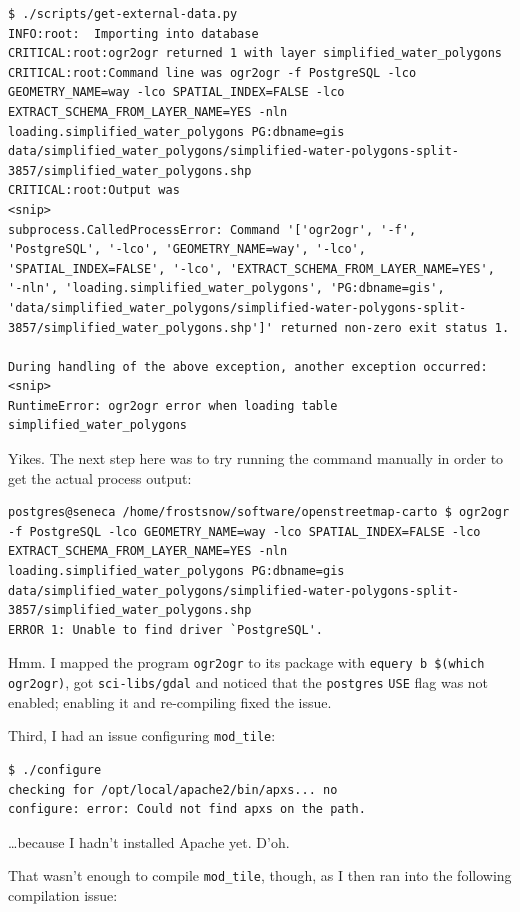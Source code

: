 \documentclass{article}
\begin{document}
\begin{verbatim}
$ ./scripts/get-external-data.py
INFO:root:  Importing into database
CRITICAL:root:ogr2ogr returned 1 with layer simplified_water_polygons
CRITICAL:root:Command line was ogr2ogr -f PostgreSQL -lco GEOMETRY_NAME=way -lco SPATIAL_INDEX=FALSE -lco EXTRACT_SCHEMA_FROM_LAYER_NAME=YES -nln loading.simplified_water_polygons PG:dbname=gis data/simplified_water_polygons/simplified-water-polygons-split-3857/simplified_water_polygons.shp
CRITICAL:root:Output was
<snip>
subprocess.CalledProcessError: Command '['ogr2ogr', '-f', 'PostgreSQL', '-lco', 'GEOMETRY_NAME=way', '-lco', 'SPATIAL_INDEX=FALSE', '-lco', 'EXTRACT_SCHEMA_FROM_LAYER_NAME=YES', '-nln', 'loading.simplified_water_polygons', 'PG:dbname=gis', 'data/simplified_water_polygons/simplified-water-polygons-split-3857/simplified_water_polygons.shp']' returned non-zero exit status 1.

During handling of the above exception, another exception occurred:
<snip>
RuntimeError: ogr2ogr error when loading table simplified_water_polygons
\end{verbatim}

Yikes.  The next step here was to try running the command manually in order to get the actual process output:

\begin{verbatim}
postgres@seneca /home/frostsnow/software/openstreetmap-carto $ ogr2ogr -f PostgreSQL -lco GEOMETRY_NAME=way -lco SPATIAL_INDEX=FALSE -lco EXTRACT_SCHEMA_FROM_LAYER_NAME=YES -nln loading.simplified_water_polygons PG:dbname=gis data/simplified_water_polygons/simplified-water-polygons-split-3857/simplified_water_polygons.shp
ERROR 1: Unable to find driver `PostgreSQL'.
\end{verbatim}

Hmm.  I mapped the program \texttt{ogr2ogr} to its package with \texttt{equery b \$(which ogr2ogr)}, got \texttt{sci-libs/gdal} and noticed that the \texttt{postgres} \texttt{USE} flag was not enabled; enabling it and re-compiling fixed the issue.

Third, I had an issue configuring \texttt{mod_tile}:

\begin{verbatim}
$ ./configure
checking for /opt/local/apache2/bin/apxs... no
configure: error: Could not find apxs on the path.
\end{verbatim}

\ldots because I hadn't installed Apache yet.  D'oh.

That wasn't enough to compile \texttt{mod_tile}, though, as I then ran into the following compilation issue:
\end{document}
